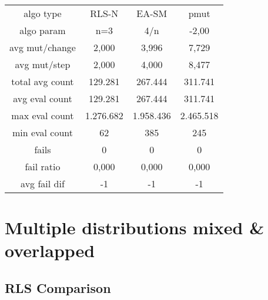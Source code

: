 \begin{tabular}[h]{cccc}
algo type&               RLS-N&        EA-SM&         pmut\\
algo param&                n=3&          4/n&        -2,00\\
avg mut/change&          2,000&        3,996&        7,729\\
avg mut/step&            2,000&        4,000&        8,477\\
\hline
total avg count&       129.281&      267.444&      311.741\\
avg eval count&        129.281&      267.444&      311.741\\
max eval count&      1.276.682&    1.958.436&    2.465.518\\
min eval count&             62&          385&          245\\
\hline
fails&                       0&            0&            0\\
fail ratio&              0,000&        0,000&        0,000\\
avg fail dif&               -1&           -1&           -1\\
\end{tabular}


\section{Multiple distributions mixed \& overlapped}

\subsection{RLS Comparison}


